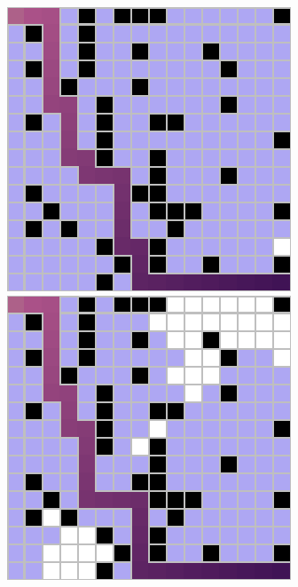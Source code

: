 \documentclass[letter]{article}
\begin{document}
\begin{questions}
	\begin{figure}
		\includegraphics[width=\linewidth]{../pics/16/BFS randomWalk 113708 31 27898.png}
		\caption{}\label{fig:q2-16}
		\endminipage\hfill
		\includegraphics[width=\linewidth]{../pics/16/BFS BDBFS quickGoal randomWalk checkFringe 151 31 23.png}

\end{figure}
\end{questions}
\end{document}

